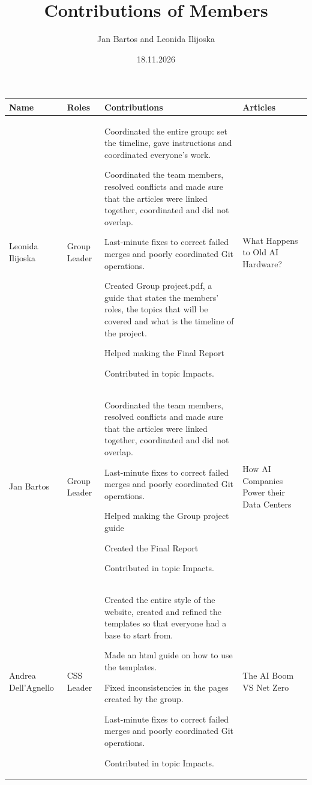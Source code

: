 \documentclass[11pt]{article}
\title{Contributions of Members}
\author{Jan Bartos and Leonida Ilijoska}
\date{18.11.2026}
\begin{document}
\maketitle

\begin{longtable} [c] {|p{3cm}|l|p{7cm}|p{4cm}|}
    \hline
    \textbf{Name} & \textbf{Roles} & \textbf{Contributions} & \textbf{Articles} \\
    \hline
    	Leonida Ilijoska & Group Leader & 
	\par \textbullet{} Coordinated the entire group: set the timeline, gave instructions and coordinated everyone’s work.
	\par \textbullet{} Coordinated the team members, resolved conflicts and made sure that the articles were linked together, coordinated and did not overlap.
	\par \textbullet{}  Last-minute fixes to correct failed merges and poorly coordinated Git operations.
	\par \textbullet{} Created Group project.pdf, a guide that states the members' roles, the topics that will be covered and what is the timeline of the project.
	\par \textbullet{} Helped making the Final Report
	\par \textbullet{} Contributed in topic Impacts. &
	What Happens to Old AI Hardware?\\ 
	\hline
	
	Jan Bartos & Group Leader &
	\par \textbullet{} Coordinated the team members, resolved conflicts and made sure that the articles were linked together, coordinated and did not overlap.
	\par \textbullet{}  Last-minute fixes to correct failed merges and poorly coordinated Git operations.
	\par \textbullet{} Helped making the Group project guide
	\par \textbullet{} Created the Final Report
	\par \textbullet{} Contributed in topic Impacts. &
	How AI Companies Power their Data Centers\\ 
	\hline
	
	Andrea Dell'Agnello & CSS Leader &
	\par \textbullet{} Created the entire style of the website, created and refined the templates so that everyone had a base to start from. 
	\par \textbullet{} Made an html guide on how to use the templates.	
	\par \textbullet{} Fixed inconsistencies in the pages created by the group.
	\par \textbullet{}  Last-minute fixes to correct failed merges and poorly coordinated Git operations.
	\par \textbullet{} Contributed in topic Impacts. &
	The AI Boom VS Net Zero\\ 
	\hline
	

\end{longtable}
\end{document}
